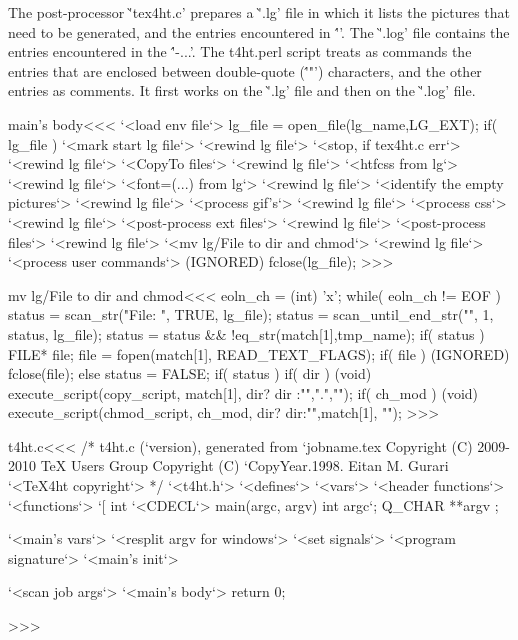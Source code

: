 The post-processor \`'tex4ht.c' prepares a \`'.lg' file in which it
lists the pictures that need to be generated, and the entries
encountered in \'''.  The \`'.log' file contains the
entries encountered in the \''\Needs-{...}'.  The t4ht.perl script
treats as commands the entries that are enclosed between double-quote
(\''"') characters, and the other entries as comments. It first works
on the \`'.lg' file and then on the \`'.log' file.



\<main's body\><<<
`<load env file`>
lg_file = open_file(lg_name,LG_EXT);
if( lg_file ) {
   `<mark start lg file`>
   `<rewind lg file`>  `<stop, if tex4ht.c err`>
   `<rewind lg file`>  `<CopyTo files`>
   `<rewind lg file`>  `<htfcss from lg`>
   `<rewind lg file`>  `<font=(...) from lg`>
   `<rewind lg file`>  `<identify the empty pictures`>
   `<rewind lg file`>  `<process gif's`>
   `<rewind lg file`>  `<process css`>
   `<rewind lg file`>  `<post-process ext files`>
   `<rewind lg file`>  `<post-process files`>
   `<rewind lg file`>  `<mv lg/File to dir and chmod`>
   `<rewind lg file`>  `<process user commands`>
   (IGNORED) fclose(lg_file);    
}
>>>

\<mv lg/File to dir and chmod\><<<
eoln_ch = (int) 'x';
while( eoln_ch != EOF ) {              
   status = scan_str("File: ", TRUE, lg_file);
   status = scan_until_end_str("", 1, status, lg_file);
   status = status && !eq_str(match[1],tmp_name);
   if( status ){
                    FILE* file;
     file = fopen(match[1], READ_TEXT_FLAGS);
     if( file ){
        (IGNORED) fclose(file);
     } else { status = FALSE; }
   }
   if( status ){
      if( dir ){                          
         (void) execute_script(copy_script, match[1], 
                               dir? dir :"",".","");
      }
      if( ch_mod ){
         (void) execute_script(chmod_script, ch_mod,
                               dir? dir:"",match[1], "");
      }
}  }
>>>

% 



\<t4ht.c\><<<
/* t4ht.c (`version), generated from `jobname.tex
   Copyright (C) 2009-2010 TeX Users Group
   Copyright (C) `CopyYear.1998. Eitan M. Gurari
`<TeX4ht copyright`> 
*/
`<t4ht.h`>
`<defines`>
`<vars`>
`<header functions`>
`<functions`>
`[
int `<CDECL`> main(argc, argv)
       int  argc`;  
       Q_CHAR **argv
;{ `<main's vars`> 
   `<resplit argv for windows`>
   `<set signals`>
   `<program signature`>
   `<main's init`> 

  `<scan job args`>
   `<main's body`>  
   return 0;
}
>>>


